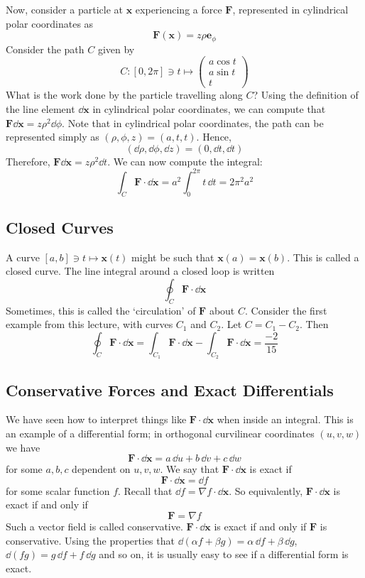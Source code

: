 \documentclass{article}
\begin{document}
Now, consider a particle at $\bm x$ experiencing a force $\bm F$, represented in cylindrical polar coordinates as
\[ \bm F(\bm x) = z\rho \bm e_{\phi} \]
Consider the path $C$ given by
\[ C \colon [0, 2\pi] \ni t \mapsto \begin{pmatrix}
        a \cos t \\ a \sin t \\ t
    \end{pmatrix} \]
What is the work done by the particle travelling along $C$? Using the definition of the line element $\dd \bm x$ in cylindrical polar coordinates, we can compute that $\bm F \dd \bm x = z \rho^2 \dd \phi$. Note that in cylindrical polar coordinates, the path can be represented simply as $(\rho, \phi, z) = (a, t, t)$. Hence,
\[ (\dd \rho, \dd \phi, \dd z) = (0, \dd t, \dd t) \]
Therefore, $\bm F \dd \bm x = z \rho^2 \dd t$. We can now compute the integral:
\[ \int_C \bm F \cdot \dd \bm x = a^2 \int_0^{2\pi} t\,\dd t = 2\pi^2a^2 \]

\subsection{Closed Curves}
A curve $[a, b] \ni t \mapsto \bm x(t)$ might be such that $\bm x(a) = \bm x(b)$. This is called a closed curve. The line integral around a closed loop is written
\[ \oint_C \bm F \cdot \dd \bm x \]
Sometimes, this is called the `circulation' of $\bm F$ about $C$. Consider the first example from this lecture, with curves $C_1$ and $C_2$. Let $C = C_1 - C_2$. Then
\[ \oint_C \bm F \cdot \dd \bm x = \int_{C_1} \bm F \cdot \dd \bm x - \int_{C_2} \bm F \cdot \dd \bm x = \frac{-2}{15} \]

\subsection{Conservative Forces and Exact Differentials}
We have seen how to interpret things like $\bm F \cdot \dd \bm x$ when inside an integral. This is an example of a differential form; in orthogonal curvilinear coordinates $(u, v, w)$ we have
\[ \bm F \cdot \dd \bm x = a \, \dd u + b \, \dd v + c \, \dd w \]
for some $a, b, c$ dependent on $u, v, w$. We say that $\bm F \cdot \dd \bm x$ is exact if
\[ \bm F \cdot \dd \bm x = \dd f \]
for some scalar function $f$. Recall that $\dd f = \nabla f \cdot \dd \bm x$. So equivalently, $\bm F \cdot \dd \bm x$ is exact if and only if
\[ \bm F = \nabla f \]
Such a vector field is called conservative. $\bm F \cdot \dd \bm x$ is exact if and only if $\bm F$ is conservative. Using the properties that $\dd (\alpha f + \beta g) = \alpha \, \dd f + \beta \, \dd g$, $\dd (fg) = g \, \dd f + f \, \dd g$ and so on, it is usually easy to see if a differential form is exact.
\end{document}
